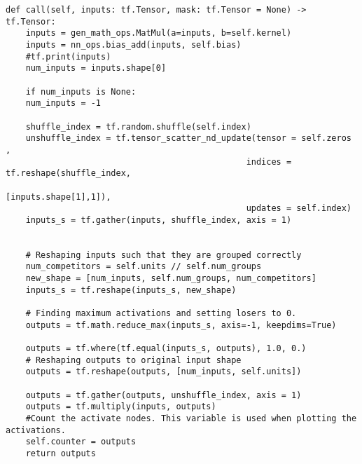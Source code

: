 \lstset{style=Python}
\begin{lstlisting}[caption={Python implementation for the custom activation function used to define the \ac{SCO} layer.},captionpos=b, label={lst:channel_out}]
    def call(self, inputs: tf.Tensor, mask: tf.Tensor = None) -> tf.Tensor:
    inputs = gen_math_ops.MatMul(a=inputs, b=self.kernel)
    inputs = nn_ops.bias_add(inputs, self.bias)
    #tf.print(inputs)
    num_inputs = inputs.shape[0]

    if num_inputs is None:
    num_inputs = -1

    shuffle_index = tf.random.shuffle(self.index)
    unshuffle_index = tf.tensor_scatter_nd_update(tensor = self.zeros , 
                                                indices = tf.reshape(shuffle_index, 
                                                                    [inputs.shape[1],1]), 
                                                updates = self.index)
    inputs_s = tf.gather(inputs, shuffle_index, axis = 1)


    # Reshaping inputs such that they are grouped correctly
    num_competitors = self.units // self.num_groups
    new_shape = [num_inputs, self.num_groups, num_competitors]
    inputs_s = tf.reshape(inputs_s, new_shape)

    # Finding maximum activations and setting losers to 0.
    outputs = tf.math.reduce_max(inputs_s, axis=-1, keepdims=True)

    outputs = tf.where(tf.equal(inputs_s, outputs), 1.0, 0.)
    # Reshaping outputs to original input shape
    outputs = tf.reshape(outputs, [num_inputs, self.units])

    outputs = tf.gather(outputs, unshuffle_index, axis = 1) 
    outputs = tf.multiply(inputs, outputs)
    #Count the activate nodes. This variable is used when plotting the activations.
    self.counter = outputs
    return outputs 
\end{lstlisting}
\newpage
\lstset{style=Python}
